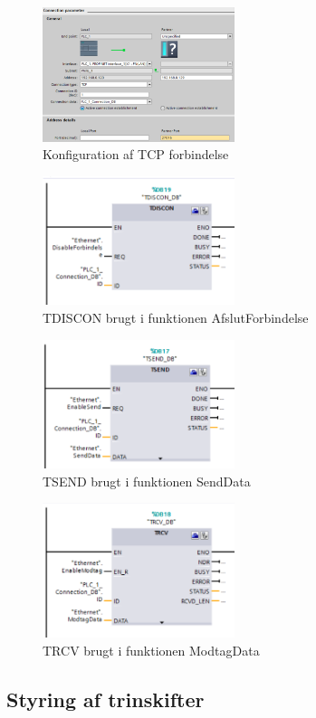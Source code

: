 \begin{figure}[H] %
	\centering
	\includegraphics[width=0.5\textwidth]{Figure/KonfigurationAfTCPforbindelse}
	\caption{Konfiguration af TCP forbindelse}
	\label{fig:Konfiguration}
\end{figure}

\begin{figure}[H] %
	\centering
	\includegraphics[width=0.5\textwidth]{Figure/TDISCON}
	\caption{TDISCON brugt i funktionen AfslutForbindelse}
	\label{fig:TDISCON}
\end{figure}

\begin{figure}[H] %
	\centering
	\includegraphics[width=0.5\textwidth]{Figure/TSEND}
	\caption{TSEND brugt i funktionen SendData}
	\label{fig:TSEND}
\end{figure}

\begin{figure}[H] %
	\centering
	\includegraphics[width=0.5\textwidth]{Figure/TRCV}
	\caption{TRCV brugt i funktionen ModtagData}
	\label{fig:TRCV}
\end{figure}


\subsection{Styring af trinskifter}